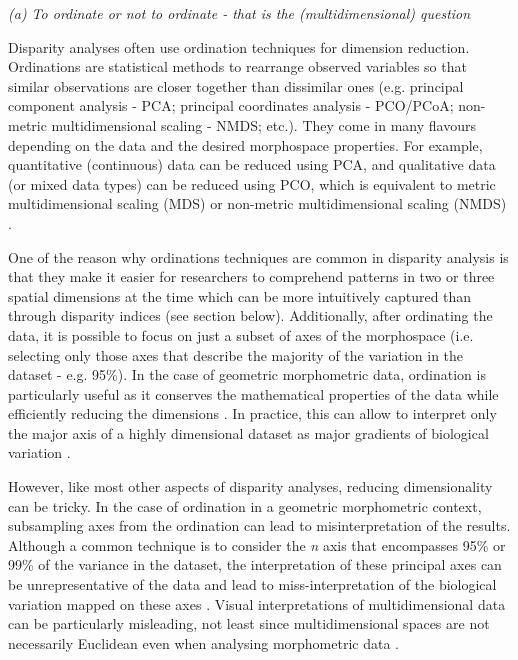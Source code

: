 \documentclass[12pt,letterpaper]{article}
\renewcommand{\subsection}[1]{%
\bigskip
\begin{center}
\begin{large}
\normalfont\itshape #1
\end{large}
\end{center}}
\begin{document}
\subsection{(a) To ordinate or not to ordinate - that is the (multidimensional) question}

Disparity analyses often use ordination techniques for dimension reduction.
Ordinations are statistical methods to rearrange observed variables so that similar observations are closer together than dissimilar ones (e.g. principal component analysis - PCA; principal coordinates analysis - PCO/PCoA; non-metric multidimensional scaling - NMDS; etc.).
They come in many flavours depending on the data and the desired morphospace properties.
For example, quantitative (continuous) data can be reduced using PCA, and qualitative data (or mixed data types) can be reduced using PCO, which is equivalent to metric multidimensional scaling (MDS) or non-metric multidimensional scaling (NMDS) \citep[see][chapter 9 for a detailed overview of ordination methods and properties]{Legendre2012-va}.

One of the reason why ordinations techniques are common in disparity analysis is that they make it easier for researchers to comprehend patterns in two or three spatial dimensions at the time which can be more intuitively captured than through disparity indices (see section below). %
Additionally, after ordinating the data, it is possible to focus on just a subset of axes of the morphospace (i.e. selecting only those axes that describe the majority of the variation in the dataset - e.g. 95\%).
In the case of geometric morphometric data, ordination is particularly useful as it conserves the mathematical properties of the data while efficiently reducing the dimensions \citep{Legendre2012-va,dryden2016statistical}.
In practice, this can allow to interpret only the major axis of a highly dimensional dataset as major gradients of biological variation \citep[e.g. the elongation and flattening of birds beaks;][]{Cooney2017-ly}.

However, like most other aspects of disparity analyses, reducing dimensionality can be tricky.
In the case of ordination in a geometric morphometric context, subsampling axes from the ordination can lead to misinterpretation of the results. 
Although a common technique is to consider the \textit{n} axis that encompasses 95\% or 99\% of the variance in the dataset, the interpretation of these principal axes can be unrepresentative of the data and lead to miss-interpretation of the biological variation mapped on these axes \citep{Bookstein2015-yy, Bookstein2017-qk, Bookstein2017-gu,Weisbecker2019-kp}.
Visual interpretations of multidimensional data can be particularly misleading, not least since multidimensional spaces are not necessarily Euclidean even when analysing morphometric data \citep{Deline2018-le, Gerber2017-xi}.
\end{document}
